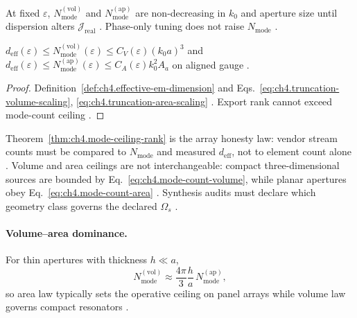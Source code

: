 \begin{theorem}
\label{thm:ch4.mode-count-monotone}
At fixed \(\varepsilon\), \(N_{\mathrm{mode}}^{\mathrm{(vol)}}\) and \(N_{\mathrm{mode}}^{\mathrm{(ap)}}\) are non-decreasing in \(k_{0}\) and aperture size
until dispersion alters \(\mathcal{J}_{\mathrm{real}}\) \cite{stratton1941,jackson1999,hansen1988}. Phase-only tuning does not raise \(N_{\mathrm{mode}}\)
\cite{devaney2004,harrington2001}.
\end{theorem}

\begin{theorem}
\label{thm:ch4.mode-ceiling-rank}
\(d_{\mathrm{eff}}(\varepsilon)\le N_{\mathrm{mode}}^{\mathrm{(vol)}}(\varepsilon)\le C_{V}(\varepsilon)(k_{0}a)^{3}\) and
\(d_{\mathrm{eff}}(\varepsilon)\le N_{\mathrm{mode}}^{\mathrm{(ap)}}(\varepsilon)\le C_{A}(\varepsilon)k_{0}^{2}A_{a}\) on aligned gauge
\cite{collin2001,jackson1999,hansen1988,harrington2001,stratton1941}.
\end{theorem}
\begin{proof}
Definition~\ref{def:ch4.effective-em-dimension} and Eqs.~\eqref{eq:ch4.truncation-volume-scaling}, \eqref{eq:ch4.truncation-area-scaling}
\cite{stratton1941,hansen1988,harrington2001}. Export rank cannot exceed mode-count ceiling \cite{devaney2004}.
\end{proof}

Theorem~\ref{thm:ch4.mode-ceiling-rank} is the array honesty law: vendor stream counts must be compared to \(N_{\mathrm{mode}}\) and measured
\(d_{\mathrm{eff}}\), not to element count alone \cite{collin2001,harrington2001,hansen1988}. Volume and area ceilings are not interchangeable:
compact three-dimensional sources are bounded by Eq.~\eqref{eq:ch4.mode-count-volume}, while planar apertures obey
Eq.~\eqref{eq:ch4.mode-count-area} \cite{jackson1999,stratton1941,hansen1988}. Synthesis audits must declare which geometry class governs the
declared \(\Omega_{s}\) \cite{harrington2001,devaney2004}.

\paragraph{Volume--area dominance.}
For thin apertures with thickness \(h\ll a\),
\begin{equation}
\label{eq:ch4.vol-area-dominance}
N_{\mathrm{mode}}^{\mathrm{(vol)}}\approx\frac{4\pi}{3}\frac{h}{a}\,N_{\mathrm{mode}}^{\mathrm{(ap)}},
\end{equation}
so area law typically sets the operative ceiling on panel arrays while volume law governs compact resonators \cite{collin2001,jackson1999,hansen1988,harrington2001}.

